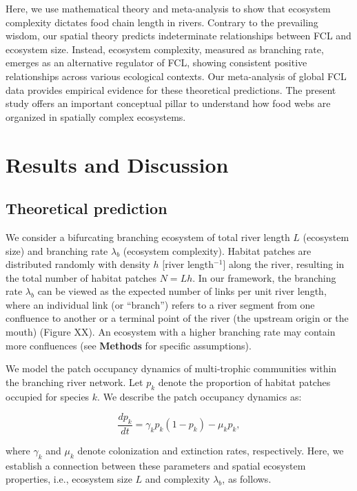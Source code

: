 \documentclass[11pt, class=article, crop=false]{standalone}
\begin{document}
Here, we use mathematical theory and meta-analysis to show that ecosystem complexity dictates food chain length in rivers.
Contrary to the prevailing wisdom, our spatial theory predicts indeterminate relationships between FCL and ecosystem size.
Instead, ecosystem complexity, measured as branching rate, emerges as an alternative regulator of FCL, showing consistent positive relationships across various ecological contexts.
Our meta-analysis of global FCL data provides empirical evidence for these theoretical predictions.
The present study offers an important conceptual pillar to understand how food webs are organized in spatially complex ecosystems.

\section{Results and Discussion}

\subsection{Theoretical prediction}

We consider a bifurcating branching ecosystem of total river length $L$ (ecosystem size) and branching rate $\lambda_b$ (ecosystem complexity).
Habitat patches are distributed randomly with density $h$ [river length$^{-1}$] along the river, resulting in the total number of habitat patches $N = Lh$.
In our framework, the branching rate $\lambda_b$ can be viewed as the expected number of links per unit river length, where an individual link (or ``branch'') refers to a river segment from one confluence to another or a terminal point of the river (the upstream origin or the mouth) (Figure XX).
An ecosystem with a higher branching rate may contain more confluences (see \textbf{Methods} for specific assumptions).

We model the patch occupancy dynamics of multi-trophic communities within the branching river network.
Let $p_k$ denote the proportion of habitat patches occupied for species $k$.
We describe the patch occupancy dynamics as:

\begin{equation}
    \frac{dp_k}{dt} = \gamma_{k} p_k (1 - p_k) - \mu_k p_k,
    \label{eq:model0}
\end{equation}

where $\gamma_k$ and $\mu_k$ denote colonization and extinction rates, respectively.
Here, we establish a connection between these parameters and spatial ecosystem properties, i.e., ecosystem size $L$ and complexity $\lambda_b$, as follows.
\end{document}
